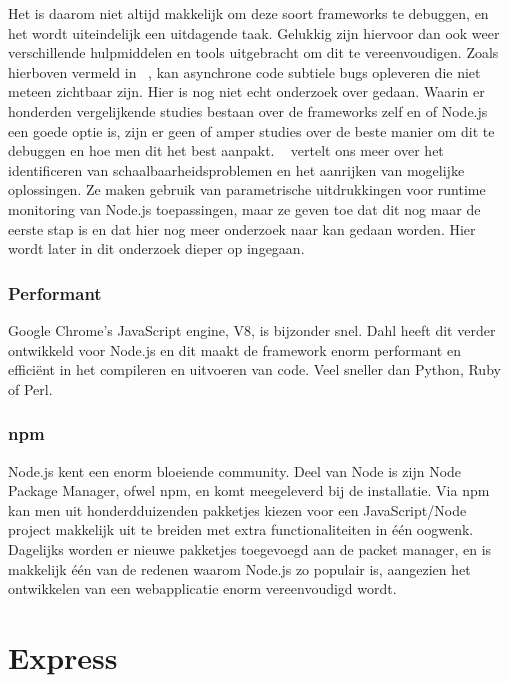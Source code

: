 Het is daarom niet altijd makkelijk om deze soort frameworks te debuggen, en het wordt uiteindelijk een uitdagende taak. Gelukkig zijn hiervoor dan ook weer verschillende hulpmiddelen en tools uitgebracht om dit te vereenvoudigen. Zoals hierboven vermeld in ~\autocite{Runtime2017}, kan asynchrone code subtiele bugs opleveren die niet meteen zichtbaar zijn.  Hier is nog niet echt onderzoek over gedaan. Waarin er honderden vergelijkende studies bestaan over de frameworks zelf en of Node.js een goede optie is, zijn er geen of amper studies over de beste manier om dit te debuggen en hoe men dit het best aanpakt. ~\autocite{Runtime2017} vertelt ons meer over het identificeren van schaalbaarheidsproblemen en het aanrijken van mogelijke oplossingen. Ze maken gebruik van parametrische uitdrukkingen voor runtime monitoring van Node.js toepassingen, maar ze geven toe dat dit nog maar de eerste stap is en dat hier nog meer onderzoek naar kan gedaan worden. Hier wordt later in dit onderzoek dieper op ingegaan.

\subsubsection{Performant}
\label{sec:fast}

Google Chrome's JavaScript engine, V8, is bijzonder snel. Dahl heeft dit verder ontwikkeld voor Node.js en dit maakt de framework enorm performant en efficiënt in het compileren en uitvoeren van code. Veel sneller dan Python, Ruby of Perl.

\subsubsection{npm}
\label{sec:npm}

Node.js kent een enorm bloeiende community. Deel van Node is zijn Node Package Manager, ofwel npm, en komt meegeleverd bij de installatie. Via npm kan men uit honderdduizenden pakketjes kiezen voor een JavaScript/Node project makkelijk uit te breiden met extra functionaliteiten in één oogwenk. Dagelijks worden er nieuwe pakketjes toegevoegd aan de packet manager, en is makkelijk één van de redenen waarom Node.js zo populair is, aangezien het ontwikkelen van een webapplicatie enorm vereenvoudigd wordt.   

\section{Express}
\label{sec:express}

